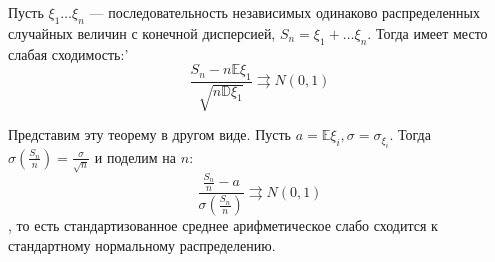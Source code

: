 \begin{theorem}
    Пусть \(\xi_1 \dots \xi_n\) --- последовательность независимых одинаково распределенных случайных величин с конечной дисперсией, \(S_n = \xi_1 + \dots \xi_n\). Тогда имеет место слабая сходимость:'
    \[\frac{S_n - n \mathbb{E}\xi_1}{\sqrt{n \mathbb{D}\xi_1}} \rightrightarrows N(0, 1)\]
\end{theorem}
\begin{remark}
    Представим эту теорему в другом виде. Пусть \(a = \mathbb{E}\xi_i, \sigma = \sigma_{\xi_i}\). Тогда \(\sigma\left( \frac{S_n}{n} \right) = \frac{\sigma}{\sqrt{n}}\) и поделим на \(n\):
    \[\frac{\frac{S_n}{n} - a}{\sigma\left( \frac{S_n}{n} \right)} \rightrightarrows N(0, 1)\]
    , то есть стандартизованное среднее арифметическое слабо сходится к стандартному нормальному распределению.
\end{remark}
